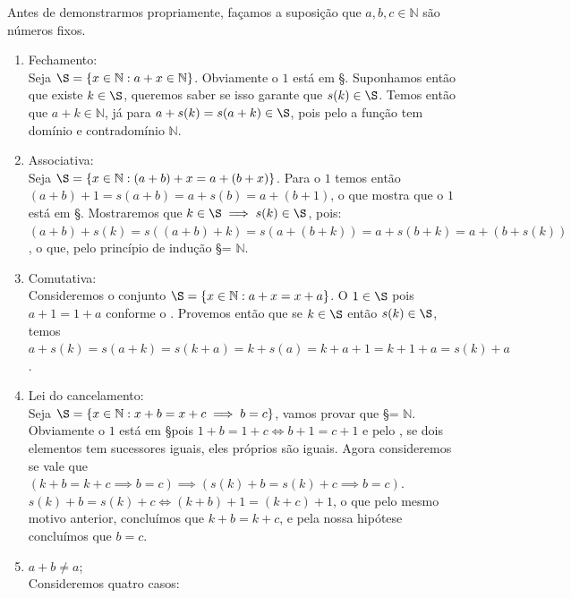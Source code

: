 \documentclass[../main.tex]{subfiles}
\begin{document}
\begin{dem}
    Antes de demonstrarmos propriamente, façamos a suposição que $a,b,c \in \mathbb{N}$ são números fixos.
    \begin{enumerate}[label=(\roman*)]    
        \item Fechamento: \\
            Seja $\S = \{ x \in \mathbb{N} : a + x \in \mathbb{N} \}$. Obviamente o $1$ está em \S. Suponhamos então que existe $k \in \S$, queremos saber se isso garante que $s(k) \in \S$. Temos então que $a + k \in \mathbb{N}$, já para $a + s(k) = s(a + k) \in \S$, pois pelo  a função tem domínio e contradomínio $\mathbb{N}$.
        \item Associativa: \\
             Seja $\S = \{ x \in \mathbb{N} : (a + b) + x = a + (b + x) \}$. Para o $1$ temos então
             $(a + b) + 1 = s(a + b) = a + s(b) = a + (b + 1)$, o que mostra que o $1$ está em \S. 
             Mostraremos que $k \in \S \implies s(k) \in \S$, pois:
             $(a + b) + s(k) = s( (a + b) + k) = s(a + (b + k)) = a + s(b + k) = a + (b + s(k))$, o que, pelo princípio de indução \S = $\mathbb{N}$.
        \item Comutativa: \\
            Consideremos o conjunto $\S = \{ x \in \mathbb{N} : a + x = x + a\}$. O $1 \in \S$ pois 
            $a + 1 = 1 + a$ conforme o .
            Provemos então que se $k \in \S$ então $s(k) \in \S$, temos 
            $a + s(k) = s(a + k) = s(k + a) = k + s(a) = k + a + 1 = k + 1 + a = s(k) + a$.
        \item Lei do cancelamento: \\
            Seja $\S = \{ x \in \mathbb{N} : x + b = x + c \implies b = c \}$, vamos provar que \S = $\mathbb{N}$. Obviamente o $1$ está em \S pois $1 + b = 1 + c \iff b + 1 = c + 1$ e pelo , se dois elementos tem sucessores iguais, eles próprios são iguais. Agora consideremos se vale que $(k + b = k + c \implies b = c) \implies (s(k) + b = s(k) + c \implies b = c)$. \\
            $s(k) + b = s(k) + c \iff (k + b) + 1 = (k + c) + 1$, o que pelo mesmo motivo anterior, concluímos que $k + b = k + c$, e pela nossa hipótese concluímos que $b = c$.
        \item $a + b \neq a$;\\
            Consideremos quatro casos:
            \begin{enumerate}[label=(\arabic*)]

\end{enumerate}
\end{enumerate}
\end{dem}
\end{document}
